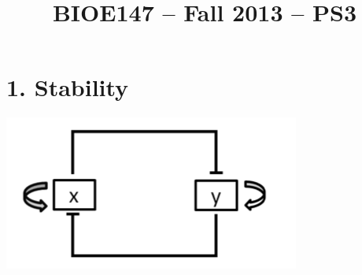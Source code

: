 \documentclass[11pt]{article}
\title{BIOE147 -- Fall 2013 -- PS3}
\author{\Name}
\begin{document}
\maketitle
\section*{1. Stability}
 
{\centering
  \includegraphics[scale=0.75, trim = 0mm 0mm 7mm 0mm, clip]{ps3_stability.png}\par
 }
\end{document}
